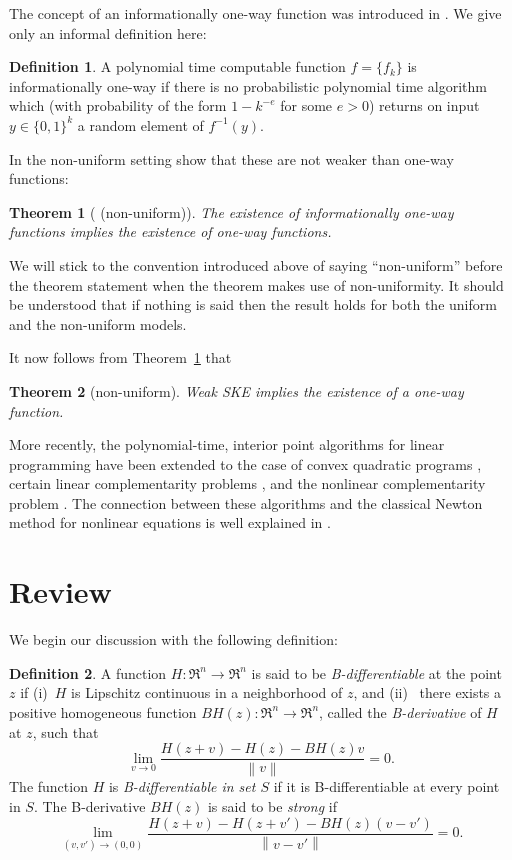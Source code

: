 \documentclass{article}
\newtheorem{thm}{Theorem}[section]
\theoremstyle{definition}
\newtheorem{defn}{Definition}[section]
\theoremstyle{remark}
\newcommand{\thmref}[1]{Theorem~\ref{#1}}
\newcommand{\enVert}[1]{\left\lVert#1\right\rVert}
\begin{document}
The concept of an informationally one-way function was introduced
in \cite{imlelu:oneway}. We give only an informal definition here:

\begin{defn} A polynomial time
computable function $f = \{f_k\}$ is informationally
one-way if there is no probabilistic polynomial time algorithm which
(with probability of the form $1 - k^{-e}$ for some $e > 0$)
returns on input $y \in \{0,1\}^{k}$ a random element of $f^{-1}(y)$.
\end{defn}
In the non-uniform setting \cite{imlelu:oneway} show that these are not
weaker than one-way functions:
\begin{thm}[\cite{imlelu:oneway} (non-uniform)]
\label{th-info-ow-ow}
The existence of informationally one-way functions
implies the existence of one-way functions.
\end{thm}
We will stick to the convention introduced above of saying
``non-uniform'' before the theorem statement when the theorem
makes use of non-uniformity. It should be understood that
if nothing is said then the result holds for both the uniform and
the non-uniform models.

It now follows from \thmref{th-info-ow-ow} that

\begin{thm}[non-uniform]\label{th-weak-ske-owf} Weak SKE
implies the existence of a one-way function.
\end{thm}

More recently, the polynomial-time, interior point algorithms for linear
programming have been extended to the case of convex quadratic programs
\cite{moad:quadpro,ye:intalg}, certain linear complementarity problems
\cite{komiyo:lincomp,miyoki:lincomp}, and the nonlinear complementarity
problem \cite{komiyo:unipfunc}. The connection between these algorithms
and the classical Newton method for nonlinear equations is well
explained in \cite{komiyo:lincomp}.

\section{Review}
\label{computation}

We begin our discussion with the following definition:

\begin{defn}

A function $H\colon \Re^n \to \Re^n$ is said to be
\emph{B-differentiable} at the point $z$ if (i)~$H$ is Lipschitz
continuous in a neighborhood of $z$, and (ii)~ there exists a positive
homogeneous function $BH(z)\colon \Re^n \to \Re^n$, called the
\emph{B-derivative} of $H$ at $z$, such that
\[ \lim_{v \to 0} \frac{H(z+v) - H(z) - BH(z)v}{\enVert{v}} = 0. \]
The function $H$ is \textit{B-differentiable in set $S$} if it is
B-differentiable at every point in $S$. The B-derivative $BH(z)$ is said
to be \textit{strong} if
\[ \lim_{(v,v') \to (0,0)} \frac{H(z+v) - H(z+v') - BH(z)(v
 -v')}{\enVert{v - v'}} = 0. \]
\end{defn}
\end{document}
